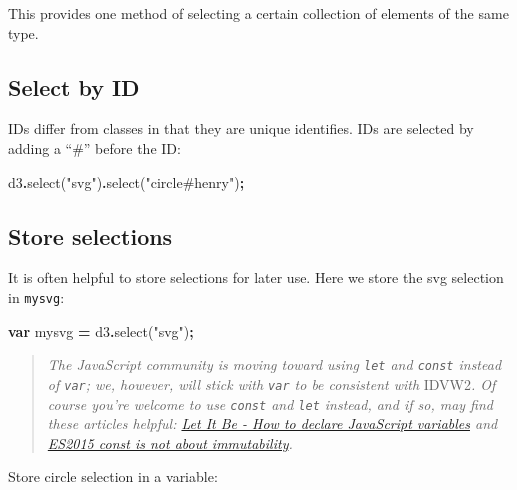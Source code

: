 \documentclass[
  openany]{book}
\newenvironment{Shaded}{\begin{snugshade}}{\end{snugshade}}
\newcommand{\FunctionTok}[1]{\textcolor[rgb]{0.00,0.00,0.00}{#1}}
\newcommand{\KeywordTok}[1]{\textcolor[rgb]{0.13,0.29,0.53}{\textbf{#1}}}
\newcommand{\NormalTok}[1]{#1}
\newcommand{\OperatorTok}[1]{\textcolor[rgb]{0.81,0.36,0.00}{\textbf{#1}}}
\newcommand{\StringTok}[1]{\textcolor[rgb]{0.31,0.60,0.02}{#1}}
\begin{document}
This provides one method of selecting a certain collection of elements of the same type.

\hypertarget{select-by-id}{%
\subsection{Select by ID}\label{select-by-id}}

IDs differ from classes in that they are unique identifies. IDs are selected by adding a ``\#'' before the ID:

\begin{Shaded}
\begin{Highlighting}[]
\NormalTok{d3}\OperatorTok{.}\FunctionTok{select}\NormalTok{(}\StringTok{"svg"}\NormalTok{)}\OperatorTok{.}\FunctionTok{select}\NormalTok{(}\StringTok{"circle\#henry"}\NormalTok{)}\OperatorTok{;}
\end{Highlighting}
\end{Shaded}

\hypertarget{store-selections}{%
\subsection{Store selections}\label{store-selections}}

It is often helpful to store selections for later use. Here we store the svg selection in \texttt{mysvg}:

\begin{Shaded}
\begin{Highlighting}[]
\KeywordTok{var}\NormalTok{ mysvg }\OperatorTok{=}\NormalTok{ d3}\OperatorTok{.}\FunctionTok{select}\NormalTok{(}\StringTok{"svg"}\NormalTok{)}\OperatorTok{;}
\end{Highlighting}
\end{Shaded}

\begin{quote}
\emph{The JavaScript community is moving toward using \texttt{let} and \texttt{const} instead of \texttt{var}; we, however, will stick with \texttt{var} to be consistent with }IDVW2\emph{. Of course you're welcome to use \texttt{const} and \texttt{let} instead, and if so, may find these articles helpful: \href{https://madhatted.com/2016/1/25/let-it-be}{Let It Be - How to declare JavaScript variables} and \href{https://mathiasbynens.be/notes/es6-const}{ES2015 const is not about immutability}.}
\end{quote}

Store circle selection in a variable:
\end{document}
